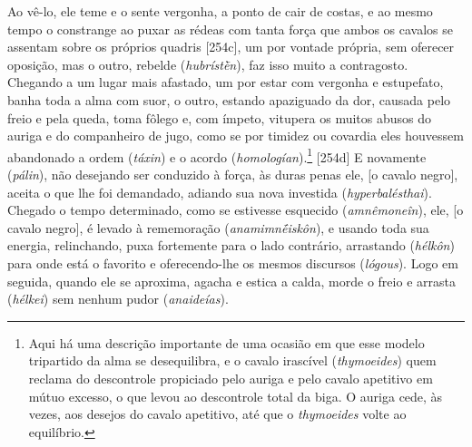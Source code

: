 Ao vê-lo, ele teme e o sente vergonha, a ponto de cair de costas, e ao
mesmo tempo o constrange ao puxar as rédeas com tanta força que ambos os
cavalos se assentam sobre os próprios quadris {[}254c{]}, um por vontade
própria, sem oferecer oposição, mas o outro, rebelde (\emph{hubrístḕn}),
faz isso muito a contragosto. Chegando a um lugar mais afastado, um por
estar com vergonha e estupefato, banha toda a alma com suor, o outro,
estando apaziguado da dor, causada pelo freio e pela queda, toma fôlego
e, com ímpeto, vitupera os muitos abusos do auriga e do companheiro de
jugo, como se por timidez ou covardia eles houvessem abandonado a ordem
(\emph{táxin}) e o acordo (\emph{homologían}).\footnote{Aqui há uma
  descrição importante de uma ocasião em que esse modelo tripartido da
  alma se desequilibra, e o cavalo irascível (\emph{thymoeides}) quem
  reclama do descontrole propiciado pelo auriga e pelo cavalo apetitivo
  em mútuo excesso, o que levou ao descontrole total da biga. O auriga
  cede, às vezes, aos desejos do cavalo apetitivo, até que o
  \emph{thymoeides} volte ao equilíbrio.} {[}254d{]} E novamente
(\emph{pálin}), não desejando ser conduzido à força, às duras penas ele,
{[}o cavalo negro{]}, aceita o que lhe foi demandado, adiando sua nova
investida (\emph{hyperbalésthai}). Chegado o tempo determinado, como se
estivesse esquecido (\emph{amnêmoneîn}), ele, {[}o cavalo negro{]}, é
levado à rememoração (\emph{anamimnḗiskôn}), e usando toda sua energia,
relinchando, puxa fortemente para o lado contrário, arrastando
(\emph{hélkôn}) para onde está o favorito e oferecendo-lhe os mesmos
discursos (\emph{lógous}). Logo em seguida, quando ele se aproxima,
agacha e estica a calda, morde o freio e arrasta (\emph{hélkei}) sem
nenhum pudor (\emph{anaideías}).

